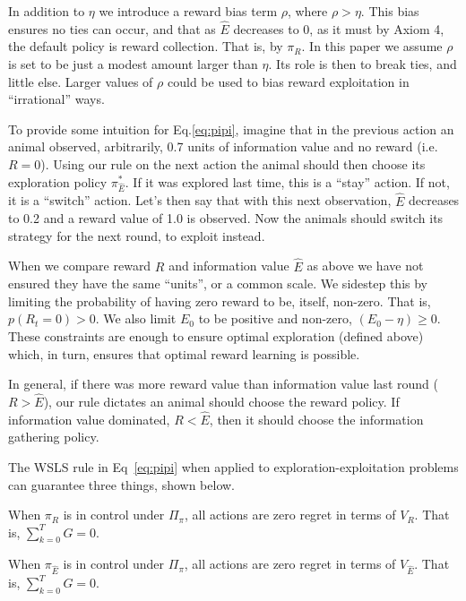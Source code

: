 In addition to $\eta$ we introduce a reward bias term $\rho$, where $\rho > \eta$. This bias ensures no ties can occur, and that as $\hat E$ decreases to 0, as it must by Axiom 4, the default policy is reward collection. That is, by $\pi_R$. In this paper we assume $\rho$ is set to be just a modest amount larger than $\eta$. Its role is then to break ties, and little else. Larger values of $\rho$ could be used to bias reward  exploitation in ``irrational'' ways.

To provide some intuition for Eq.\ref{eq:pipi}, imagine that in the previous action an animal observed, arbitrarily, 0.7 units of information value and no reward (i.e. $R = 0$). Using our rule on the next action the animal should then choose its exploration policy $\pi^*_{\hat{E}}$. If it was explored last time, this is a ``stay'' action. If not, it is a ``switch'' action. Let's then say that with this next observation, $\hat E$ decreases to 0.2 and a reward value of 1.0 is observed. Now the animals should switch its strategy for the next round, to exploit instead.

When we compare reward $R$ and information value $\hat E$ as above we have not ensured they have the same ``units'', or a common scale. We sidestep this by limiting the probability of having zero reward to be, itself, non-zero. That is, $p(R_t=0) > 0$. We also limit $E_0$ to be positive and non-zero, $(E_0 - \eta) \geq 0$. These constraints are enough to ensure optimal exploration (defined above) which, in turn, ensures that optimal reward learning is possible.

In general, if there was more reward value than information value last round ($R > \hat E$), our rule dictates an animal should choose the reward policy. If information value dominated, $R < \hat E$, then it should choose the information gathering policy.

The WSLS rule in Eq~\ref{eq:pipi} when applied to exploration-exploitation problems can guarantee three things, shown below. 

\begin{theorem}
	\label{th:no_regret_R}
	When $\pi_R$ is in control under $\Pi_{\pi}$, all actions are zero regret in terms of $V_R$. That is, $\sum_{k=0}^{T} G = 0$.
\end{theorem}

\begin{theorem}
	\label{th:no_regret_E}
	When $\pi_{\hat E}$ is in control under $\Pi_{\pi}$, all actions are zero regret in terms of $V_{\hat E}$. That is, $\sum_{k=0}^{T} G = 0$.
\end{theorem}

